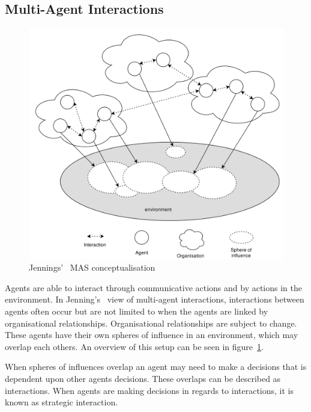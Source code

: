 \documentclass[]{final_report}
\begin{document}
\subsection{Multi-Agent Interactions}
\begin{figure}
\vspace{-20pt}
\begin{framed}
\centering
	\includegraphics[width=\textwidth]{JenningsMAS.png}
	\caption{Jennings'~\cite{jennings2000agent} MAS conceptualisation}
	\label{fig:jenningsmas}
\end{framed}
\vspace{-30pt}
\end{figure}
Agents are able to interact through communicative actions and by actions in the environment. In Jenning's~\cite{jennings2000agent} view of multi-agent interactions, interactions between agents often occur but are not limited to when the agents are linked by organisational relationships. Organisational relationships are subject to change. These agents have their own spheres of influence in an environment, which may overlap each others. An overview of this setup can be seen in figure~\ref{fig:jenningsmas}.\par 
When spheres of influences overlap an agent may need to make a decisions that is dependent upon other agents decisions. These overlaps can be described as interactions. When agents are making decisions in regards to interactions, it is known as strategic interaction.\par 
\end{document}
